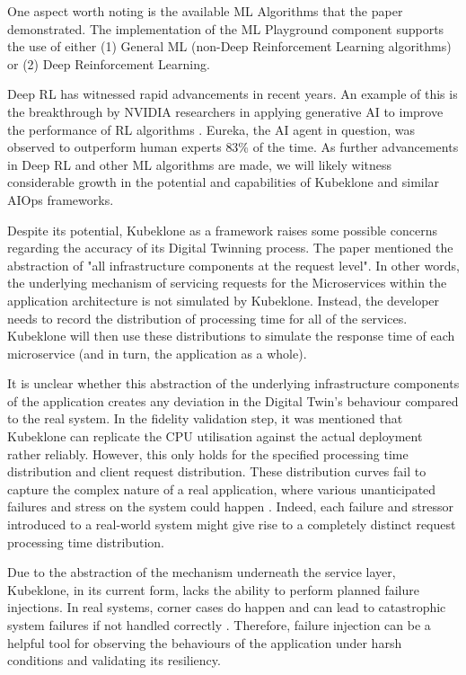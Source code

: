 One aspect worth noting is the available ML Algorithms that the paper demonstrated. The implementation of the ML Playground component supports the use of either (1) General ML (non-Deep Reinforcement Learning algorithms) or (2) Deep Reinforcement Learning. 

Deep RL has witnessed rapid advancements in recent years. An example of this is the breakthrough by NVIDIA researchers in applying generative AI to improve the performance of RL algorithms \cite{ma_eureka_2023}. Eureka, the AI agent in question, was observed to outperform human experts 83\% of the time. As further advancements in Deep RL and other ML algorithms are made, we will likely witness considerable growth in the potential and capabilities of Kubeklone and similar AIOps frameworks.

Despite its potential, Kubeklone as a framework raises some possible concerns regarding the accuracy of its Digital Twinning process. The paper mentioned the abstraction of "all infrastructure components at the request level". In other words, the underlying mechanism of servicing requests for the Microservices within the application architecture is not simulated by Kubeklone. Instead, the developer needs to record the distribution of processing time for all of the services. Kubeklone will then use these distributions to simulate the response time of each microservice (and in turn, the application as a whole).

It is unclear whether this abstraction of the underlying infrastructure components of the application creates any deviation in the Digital Twin's behaviour compared to the real system. In the fidelity validation step, it was mentioned that Kubeklone can replicate the CPU utilisation against the actual deployment rather reliably. However, this only holds for the specified processing time distribution and client request distribution. These distribution curves fail to capture the complex nature of a real application, where various unanticipated failures and stress on the system could happen \cite{basiri_chaos_2016}. Indeed, each failure and stressor introduced to a real-world system might give rise to a completely distinct request processing time distribution.

Due to the abstraction of the mechanism underneath the service layer, Kubeklone, in its current form, lacks the ability to perform planned failure injections. In real systems, corner cases do happen and can lead to catastrophic system failures if not handled correctly \cite{basiri_chaos_2016}. Therefore, failure injection can be a helpful tool for observing the behaviours of the application under harsh conditions and validating its resiliency. 

